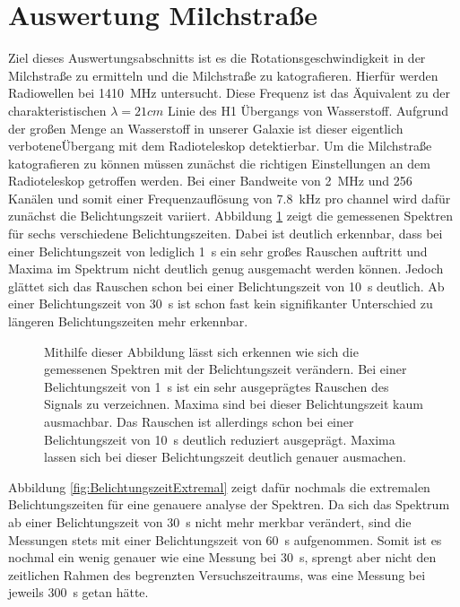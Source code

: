 \section{Auswertung Milchstraße}
Ziel dieses Auswertungsabschnitts ist es die Rotationsgeschwindigkeit in der Milchstraße zu ermitteln und die Milchstraße zu katografieren.\newline
Hierfür werden Radiowellen bei \SI{1410}{MHz} untersucht. Diese Frequenz ist das Äquivalent zu der charakteristischen $\lambda = \si{21}{cm}$ Linie des H1 Übergangs von Wasserstoff. Aufgrund der großen Menge an Wasserstoff in unserer Galaxie ist dieser eigentlich \dq verbotene\dq  Übergang mit dem Radioteleskop detektierbar.\newline
Um die Milchstraße katografieren zu können müssen zunächst die richtigen Einstellungen an dem Radioteleskop getroffen werden. Bei einer Bandweite von \SI{2}{MHz} und 256 Kanälen und somit einer Frequenzauflösung von \SI{7.8}{kHz} pro channel \cite{Usermanual} wird dafür zunächst die Belichtungszeit variiert. Abbildung \ref{fig:Belichtungszeit} zeigt die gemessenen Spektren für sechs verschiedene Belichtungszeiten. Dabei ist deutlich erkennbar, dass bei einer Belichtungszeit von lediglich \SI{1}{s} ein sehr großes Rauschen auftritt und Maxima im Spektrum nicht deutlich genug ausgemacht werden können. Jedoch glättet sich das Rauschen schon bei einer Belichtungszeit von \SI{10}{s} deutlich. Ab einer Belichtungszeit von \SI{30}{s} ist schon fast kein signifikanter Unterschied zu längeren Belichtungszeiten mehr erkennbar.
\begin{figure}[H]
    \centering
       
    \caption[Gemessenen Spektren bei verschiedenen Belichtungszeiten]{Mithilfe dieser Abbildung lässt sich erkennen wie sich die gemessenen Spektren mit der Belichtungszeit verändern. Bei einer Belichtungszeit von \SI{1}{s} ist ein sehr ausgeprägtes Rauschen des Signals zu verzeichnen. Maxima sind bei dieser Belichtungszeit kaum ausmachbar. Das Rauschen ist allerdings schon bei einer Belichtungszeit von \SI{10}{s} deutlich reduziert ausgeprägt. Maxima lassen sich bei dieser Belichtungszeit deutlich genauer ausmachen.}
    \label{fig:Belichtungszeit}
\end{figure}
Abbildung \ref{fig:BelichtungszeitExtremal} zeigt dafür nochmals die extremalen Belichtungszeiten für eine genauere analyse der Spektren. Da sich das Spektrum ab einer Belichtungszeit von \SI{30}{s} nicht mehr merkbar verändert, sind die Messungen stets mit einer Belichtungszeit von \SI{60}{s} aufgenommen. Somit ist es nochmal ein wenig genauer wie eine Messung bei \SI{30}{s}, sprengt aber nicht den zeitlichen Rahmen des begrenzten Versuchszeitraums, was eine Messung bei jeweils \SI{300}{s} getan hätte.

